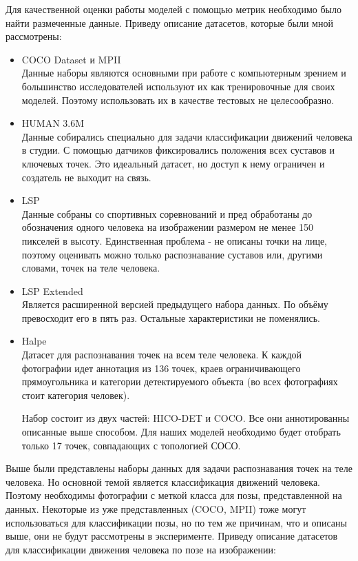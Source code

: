 Для качественной оценки работы моделей с помощью метрик необходимо было найти размеченные данные. Приведу описание датасетов, которые были мной рассмотрены:

\begin{itemize}
	\item COCO Dataset и MPII\\
	Данные наборы являются основными при работе с компьютерным зрением и большинство исследователей используют их как тренировочные для своих моделей. Поэтому использовать их в качестве тестовых не целесообразно. \cite{COCO_dataset, MPII_dataset}
	\item HUMAN 3.6M\\
	Данные собирались специально для задачи классификации движений человека в студии. С помощью датчиков фиксировались положения всех суставов и ключевых точек. Это идеальный датасет, но доступ к нему ограничен и создатель не выходит на связь. \cite{h36m_pami}
	\item LSP\\
	Данные собраны со спортивных соревнований и пред обработаны до обозначения одного человека на изображении размером не менее 150 пикселей в высоту. Единственная проблема - не описаны точки на лице, поэтому оценивать можно только распознавание суставов или, другими словами, точек на теле человека. \cite{LSP}
	\item LSP Extended\\
	Является расширенной версией предыдущего набора данных. По объёму превосходит его в пять раз. Остальные характеристики не поменялись. \cite{LSPE}
	\item Halpe\\
	Датасет для распознавания точек на всем теле человека. К каждой фотографии идет аннотация из 136 точек, краев ограничивающего прямоугольника и категории детектируемого объекта (во всех фотографиях стоит категория человек).
	
	Набор состоит из двух частей: HICO-DET и COCO. Все они аннотированны описанные выше способом. Для наших моделей необходимо будет отобрать только 17 точек, совпадающих с топологией СОСО. \cite{Halpe_dataset}
\end{itemize}

Выше были представлены наборы данных для задачи распознавания точек на теле человека. Но основной темой является классификация движений человека. Поэтому необходимы фотографии с меткой класса для позы, представленной на данных. Некоторые из уже представленных (COCO, MPII) тоже могут использоваться для классификации позы, но по тем же причинам, что и описаны выше, они не будут рассмотрены в эксперименте. Приведу описание датасетов для классификации движения человека по позе на изображении:


